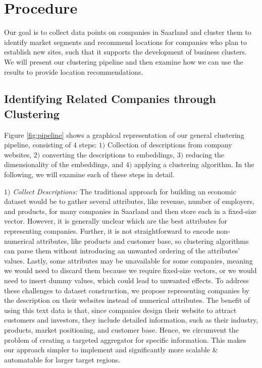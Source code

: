 \documentclass[conference]{IEEEtran}
\begin{document}
\section{Procedure}


Our goal is to collect data points on companies in Saarland and cluster them to identify market segments and recommend locations for companies who plan to establish new sites, such that it supports the development of business clusters. We will present our clustering pipeline and then examine how we can use the results to provide location recommendations. 

\subsection{Identifying Related Companies through Clustering}
Figure \ref{fig:pipeline} shows a graphical representation of our general clustering pipeline, consisting of $4$ steps: $1)$ Collection of descriptions from company websites, $2)$ converting the descriptions to embeddings, $3)$ reducing the dimensionality of the embeddings, and $4)$ applying a clustering algorithm. In the following, we will examine each of these steps in detail.

\textit{$1)$ Collect Descriptions:} The traditional approach for building an economic dataset would be to gather several attributes, like revenue, number of employers, and products, for many companies in Saarland and then store each in a fixed-size vector. However, it is generally unclear which are the best attributes for representing companies. Further, it is not straightforward to encode non-numerical attributes, like products and customer base, so clustering algorithms can parse them without introducing an unwanted ordering of the attributes' values. 
Lastly, some attributes may be unavailable for some companies, meaning we would need to discard them because we require fixed-size vectors, or we would need to insert dummy values, which could lead to unwanted effects.
To address these challenges to dataset construction, we propose representing companies by the description on their websites instead of numerical attributes. The benefit of using this text data is that, since companies design their website to attract customers and investors, they include detailed information, such as their industry, products, market positioning, and customer base. Hence, we circumvent the problem of creating a targeted aggregator for specific information. This makes our approach simpler to implement and significantly more scalable \& automatable for larger target regions. 
\end{document}

